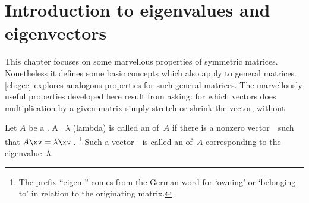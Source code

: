 

\section{Introduction to eigenvalues and eigenvectors}
\label{sec:iee}
\secttoc
{}

\begin{comment}
\pooliv{\S4.1} \layiv{\S5.1} \holti{\S6.1}  \cite[Ch.~8, 11]{Chartier2015}
\end{comment}


This chapter focuses on some marvellous properties of symmetric matrices.  
Nonetheless it defines some basic concepts which also apply to general matrices.  
\cref{ch:gee} explores analogous properties for such general matrices.
The marvellously useful properties developed here result from asking: for which vectors does multiplication by a given matrix simply stretch or shrink the vector, without 


\begin{definition} \label{def:evecval}
Let \(A\) be a .  
A ~\(\lambda\) (lambda) is called an  of~\(A\) if 
there is a nonzero vector~\xv\ such that \(A\xv=\lambda\xv\)\,. 
\footnote{The prefix ``eigen-'' comes from the German word for `owning' or `belonging to' in relation to the originating matrix. }
Such a vector~\xv\ is called an  of~\(A\) corresponding to the eigenvalue~\(\lambda\).   
\end{definition}


